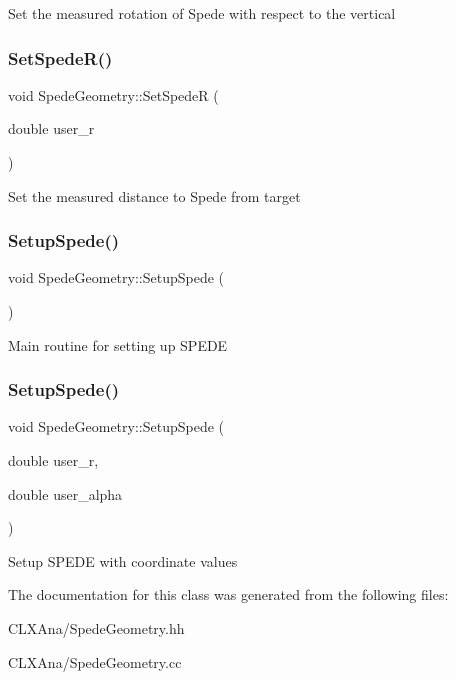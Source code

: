 Set the measured rotation of Spede with respect to the vertical \mbox{\label{class_spede_geometry_ad17f4485ee83860a40082d8c8af5237c}} 
\subsubsection{\texorpdfstring{Set\+Spede\+R()}{SetSpedeR()}}
{\footnotesize\ttfamily void Spede\+Geometry\+::\+Set\+SpedeR (\begin{DoxyParamCaption}\item[{double}]{user\+\_\+r }\end{DoxyParamCaption})}

Set the measured distance to Spede from target \mbox{\label{class_spede_geometry_aff2cf68512c9a78eb117ff1ea44e95f0}} 
\subsubsection{\texorpdfstring{Setup\+Spede()}{SetupSpede()}\hspace{0.1cm}{\footnotesize\ttfamily [1/2]}}
{\footnotesize\ttfamily void Spede\+Geometry\+::\+Setup\+Spede (\begin{DoxyParamCaption}{ }\end{DoxyParamCaption})}

Main routine for setting up S\+P\+E\+DE \mbox{\label{class_spede_geometry_ae79185d5c0e1d21a1a26ef824038ce9c}} 
\subsubsection{\texorpdfstring{Setup\+Spede()}{SetupSpede()}\hspace{0.1cm}{\footnotesize\ttfamily [2/2]}}
{\footnotesize\ttfamily void Spede\+Geometry\+::\+Setup\+Spede (\begin{DoxyParamCaption}\item[{double}]{user\+\_\+r,  }\item[{double}]{user\+\_\+alpha }\end{DoxyParamCaption})}

Setup S\+P\+E\+DE with coordinate values 

The documentation for this class was generated from the following files\+:\begin{DoxyCompactItemize}
\item 
C\+L\+X\+Ana/Spede\+Geometry.\+hh\item 
C\+L\+X\+Ana/Spede\+Geometry.\+cc\end{DoxyCompactItemize}
